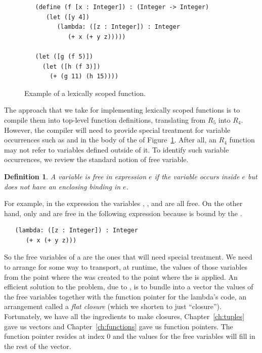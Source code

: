 \documentclass[11pt]{book}
\newtheorem{definition}[theorem]{Definition}
\begin{document}
\begin{figure}[btp]
\begin{lstlisting}
   (define (f [x : Integer]) : (Integer -> Integer)
      (let ([y 4])
         (lambda: ([z : Integer]) : Integer
            (+ x (+ y z)))))

   (let ([g (f 5)])
     (let ([h (f 3)])
       (+ (g 11) (h 15))))
\end{lstlisting}
\caption{Example of a lexically scoped function.}
\label{fig:lexical-scoping}
\end{figure}


The approach that we take for implementing lexically scoped
functions is to compile them into top-level function definitions,
translating from $R_5$ into $R_4$.  However, the compiler will need to
provide special treatment for variable occurrences such as 
and  in the body of the  of
Figure~\ref{fig:lexical-scoping}. After all, an $R_4$ function may not
refer to variables defined outside of it. To identify such variable
occurrences, we review the standard notion of free variable.

\begin{definition}
A variable is \emph{free in expression} $e$ if the variable occurs
inside $e$ but does not have an enclosing binding in $e$.
\end{definition}

For example, in the expression  the variables
, , and  are all free.  On the other hand,
only  and  are free in the following expression
because  is bound by the .
\begin{lstlisting}
   (lambda: ([z : Integer]) : Integer
      (+ x (+ y z)))
\end{lstlisting}

So the free variables of a  are the ones that will need
special treatment. We need to arrange for some way to transport, at
runtime, the values of those variables from the point where the
 was created to the point where the  is
applied. An efficient solution to the problem, due to
\citet{Cardelli:1983aa}, is to bundle into a vector the values of the
free variables together with the function pointer for the lambda's
code, an arrangement called a \emph{flat closure} (which we shorten to
just ``closure'').   Fortunately,
we have all the ingredients to make closures, Chapter~\ref{ch:tuples}
gave us vectors and Chapter~\ref{ch:functions} gave us function
pointers. The function pointer resides at index $0$ and the
values for the free variables will fill in the rest of the vector.
\end{document}
